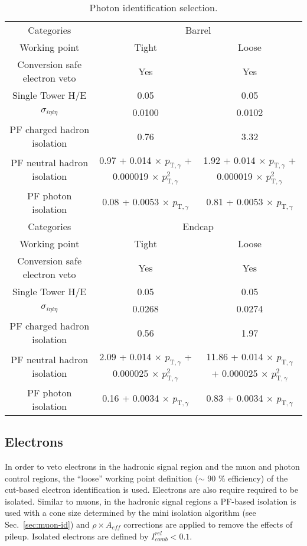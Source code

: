 \begin{table}[ht!]
  \caption{Photon identification selection.\label{tab:photon-id-gamma}}
  \centering
  \footnotesize
  \begin{tabular}{ ccc }
    \hline
    \hline
    Categories & \multicolumn{2}{c}{Barrel}   \\
    Working point  & Tight & Loose \\
    \hline
    Conversion safe electron veto & Yes & Yes  \\
    Single Tower H/E              & 0.05 & 0.05  \\
    $\sigma_{i\eta i\eta}$        & 0.0100 & 0.0102 \\
    PF charged hadron isolation   & 0.76 & 3.32  \\
    PF neutral hadron isolation   & 0.97 + 0.014 $\times$ $p_{\mathrm{T},\gamma}$ + 0.000019 $\times$ $p_{\mathrm{T},\gamma}^{2}$ & 1.92 + 0.014 $\times$ $p_{\mathrm{T},\gamma}$ + 0.000019 $\times$ $p_{\mathrm{T},\gamma}^{2}$  \\
    PF photon isolation           & 0.08 + 0.0053 $\times$ $p_{\mathrm{T},\gamma}$ & 0.81 + 0.0053 $\times$ $p_{\mathrm{T},\gamma}$ \\
    \hline
    \hline
    Categories & \multicolumn{2}{c}{Endcap}   \\
    Working point  & Tight & Loose \\
    \hline
    Conversion safe electron veto & Yes & Yes  \\
    Single Tower H/E              & 0.05 & 0.05  \\
    $\sigma_{i\eta i\eta}$        & 0.0268 & 0.0274 \\
    PF charged hadron isolation   & 0.56 & 1.97  \\
    PF neutral hadron isolation   & 2.09 + 0.014 $\times$ $p_{\mathrm{T},\gamma}$ + 0.000025 $\times$ $p_{\mathrm{T},\gamma}^{2}$ & 11.86 + 0.014 $\times$ $p_{\mathrm{T},\gamma}$ + 0.000025 $\times$ $p_{\mathrm{T},\gamma}^{2}$ \\
    PF photon isolation           &  0.16 + 0.0034 $\times$ $p_{\mathrm{T},\gamma}$ & 0.83 + 0.0034 $\times$ $p_{\mathrm{T},\gamma}$ \\
    \hline
    \hline
  \end{tabular}
  \end{table}


\subsection{Electrons}
\label{sec:electron-id}
In order to veto electrons in the hadronic signal region and the muon
and photon control regions, the ``loose'' working point definition
($\sim$ 90 $\%$ efficiency) of the cut-based electron identification
\cite{electron-id} is used.  Electrons are also require required to be
isolated.  Similar to muons, in the hadronic signal regions a PF-based
isolation \cite{pf-photon} is used with a cone size determined by the
mini isolation algorithm (see Sec.~\ref{sec:muon-id}) and $\rho\times
A_{eff}$ corrections are applied to remove the effects of pileup.
Isolated electrons are defined by $I^{rel}_{comb} < 0.1$.

